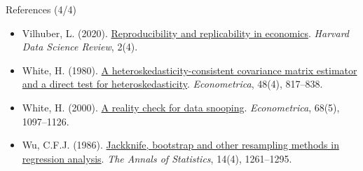 \begin{frame}{References (4/4)}
\begin{itemize}
    \item Vilhuber, L. (2020). \href{https://doi.org/10.1162/99608f92.4f6b9e67}{Reproducibility and replicability in economics}. \emph{Harvard Data Science Review}, 2(4).
    \item White, H. (1980). \href{https://doi.org/10.2307/1912934}{A heteroskedasticity-consistent covariance matrix estimator and a direct test for heteroskedasticity}. \emph{Econometrica}, 48(4), 817--838.
    \item White, H. (2000). \href{https://doi.org/10.1111/1468-0262.00152}{A reality check for data snooping}. \emph{Econometrica}, 68(5), 1097--1126.
    \item Wu, C.F.J. (1986). \href{https://doi.org/10.1214/aos/1176350142}{Jackknife, bootstrap and other resampling methods in regression analysis}. \emph{The Annals of Statistics}, 14(4), 1261--1295.
\end{itemize}
\end{frame}


